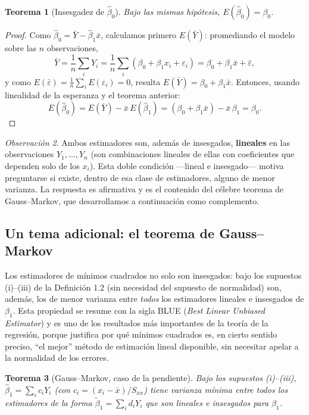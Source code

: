 \documentclass[11pt,a4paper]{article}
\theoremstyle{plain}
\newtheorem{teorema}{Teorema}[section]
\theoremstyle{definition}
\theoremstyle{remark}
\newtheorem{observacion}[teorema]{Observación}
\begin{document}
\begin{teorema}[Insesgadez de $\hat\beta_0$]
Bajo las mismas hipótesis, $E(\hat\beta_0)=\beta_0$.
\end{teorema}

\begin{proof}
Como $\hat\beta_0=\bar Y-\hat\beta_1\bar x$, calculamos primero $E(\bar Y)$: promediando el modelo sobre las $n$ observaciones,
\[
\bar Y = \frac1n\sum_i Y_i = \frac1n\sum_i(\beta_0+\beta_1x_i+\varepsilon_i) = \beta_0+\beta_1\bar x+\bar\varepsilon,
\]
y como $E(\bar\varepsilon)=\frac1n\sum_i E(\varepsilon_i)=0$, resulta $E(\bar Y)=\beta_0+\beta_1\bar x$. Entonces, usando linealidad de la esperanza y el teorema anterior:
\[
E(\hat\beta_0) = E(\bar Y) - \bar x\,E(\hat\beta_1) = (\beta_0+\beta_1\bar x) - \bar x\,\beta_1 = \beta_0.
\]
\end{proof}

\begin{observacion}
Ambos estimadores son, además de insesgados, \textbf{lineales} en las observaciones $Y_1,\dots,Y_n$ (son combinaciones lineales de ellas con coeficientes que dependen solo de los $x_i$). Esta doble condición —lineal e insesgado— motiva preguntarse si existe, dentro de esa clase de estimadores, alguno de menor varianza. La respuesta es afirmativa y es el contenido del célebre teorema de Gauss--Markov, que desarrollamos a continuación como complemento.
\end{observacion}

\subsection{Un tema adicional: el teorema de Gauss--Markov}

Los estimadores de mínimos cuadrados no solo son insesgados: bajo los supuestos (i)--(iii) de la Definición 1.2 (sin necesidad del supuesto de normalidad) son, además, los de menor varianza entre \emph{todos} los estimadores lineales e insesgados de $\beta_1$. Esta propiedad se resume con la sigla BLUE (\emph{Best Linear Unbiased Estimator}) y es uno de los resultados más importantes de la teoría de la regresión, porque justifica por qué mínimos cuadrados es, en cierto sentido preciso, ``el mejor'' método de estimación lineal disponible, sin necesitar apelar a la normalidad de los errores.

\begin{teorema}[Gauss--Markov, caso de la pendiente]
Bajo los supuestos (i)--(iii), $\hat\beta_1=\sum_i c_iY_i$ (con $c_i=(x_i-\bar x)/S_{xx}$) tiene varianza mínima entre todos los estimadores de la forma $\tilde\beta_1=\sum_i d_iY_i$ que son lineales e insesgados para $\beta_1$.
\end{teorema}
\end{document}

